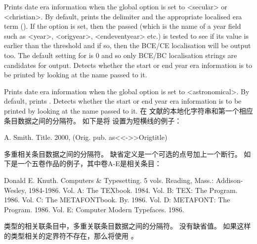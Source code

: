 \begin{ltxsyntax}
Prints date era information when the global option  is set to <secular> or <christian>. By default, prints the  delimiter and the appropriate localised era term (). If the  option is set, then the passed  (which is the name of a year field such as <year>, <origyear>, <endeventyear> etc.) is tested to see if its value is earlier than the  threshold and if so, then the BCE/CE localisation will be output too. The default setting for  is 0 and so only BCE/BC localisation strings are candidates for output. Detects whether the start or end year era information is to be printed by looking at the  name passed to it.

Prints date era information when the global option  is set to <astronomical>. By default, prints . Detects whether the start or end year era information is to be printed by looking at the  name passed to it.
在  文献的本地化字符串和第一个相应条目数据之间的分隔符。
如下是将  设置为短横线的例子：

\begin{ltxexample}
A. Smith. Title. 2000, (Orig. pub. as<<->>Origtitle)
\end{ltxexample}

多重相关条目数据之间的分隔符。
缺省定义是一个可选的点号加上一个断行。
如下是一个五卷作品的例子，其中卷A-E是相关条目：

\begin{ltxexample}
Donald E. Knuth. Computers & Typesetting. 5 vols. Reading, Mass.: Addison-Wesley, 1984-1986.
Vol. A: The TEXbook. 1984.
Vol. B: TEX: The Program. 1986.
Vol. C: The METAFONTbook. By. 1986.
Vol. D: METAFONT: The Program. 1986.
Vol. E: Computer Modern Typefaces. 1986.
\end{ltxexample}

 类型的相关联条目中，多重关联条目数据之间的分隔符。
没有缺省值。
如果这样的类型相关的定界符不存在，那么将使用 。


\end{ltxsyntax}
